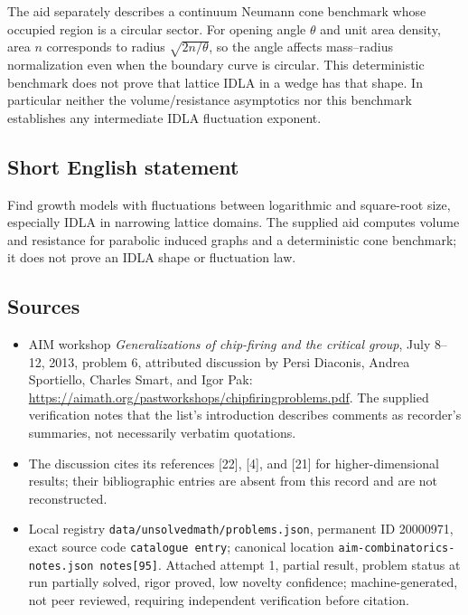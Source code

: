 \documentclass[11pt]{article}
\begin{document}
The aid separately describes a continuum Neumann cone benchmark whose occupied region is a circular sector. For opening angle $\theta$ and unit area density, area $n$ corresponds to radius $\sqrt{2n/\theta}$, so the angle affects mass--radius normalization even when the boundary curve is circular. This deterministic benchmark does not prove that lattice IDLA in a wedge has that shape. In particular neither the volume/resistance asymptotics nor this benchmark establishes any intermediate IDLA fluctuation exponent.
\subsection{Short English statement}
Find growth models with fluctuations between logarithmic and square-root size, especially IDLA in narrowing lattice domains. The supplied aid computes volume and resistance for parabolic induced graphs and a deterministic cone benchmark; it does not prove an IDLA shape or fluctuation law.
\subsection{Sources}
\begin{itemize}
\item AIM workshop \emph{Generalizations of chip-firing and the critical group}, July 8--12, 2013, problem 6, attributed discussion by Persi Diaconis, Andrea Sportiello, Charles Smart, and Igor Pak: \url{https://aimath.org/pastworkshops/chipfiringproblems.pdf}. The supplied verification notes that the list's introduction describes comments as recorder's summaries, not necessarily verbatim quotations.
\item The discussion cites its references [22], [4], and [21] for higher-dimensional results; their bibliographic entries are absent from this record and are not reconstructed.
\item Local registry \texttt{data/unsolvedmath/problems.json}, permanent ID 20000971, exact source code \texttt{catalogue entry}; canonical location \texttt{aim-combinatorics-notes.json notes[95]}. Attached attempt 1, partial result, problem status at run partially solved, rigor proved, low novelty confidence; machine-generated, not peer reviewed, requiring independent verification before citation.
\end{itemize}
\end{document}
